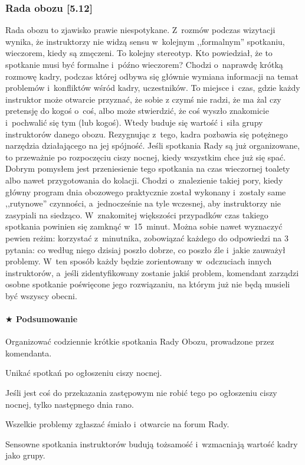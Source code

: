 \documentclass[a5paper,10pt,titlepage,twoside]{article}
\newcommand*{\thecheckbox}{\hss$\Box$} %
\newenvironment*{checklist}
{\list{}{%
\renewcommand*{\makelabel}[1]{\thecheckbox}}}
{\endlist}
\begin{document}
\subsubsection{Rada obozu [5.12]}
Rada obozu to zjawisko prawie niespotykane. Z~rozmów podczas wizytacji wynika, że instruktorzy nie widzą sensu w~kolejnym ,,formalnym'' spotkaniu, wieczorem, kiedy są zmęczeni. To kolejny stereotyp. Kto powiedział, że to spotkanie musi być formalne i~późno wieczorem? Chodzi o~naprawdę krótką rozmowę kadry, podczas której odbywa się głównie wymiana informacji na temat problemów i~konfliktów wśród kadry, uczestników. To miejsce i~czas, gdzie każdy instruktor może otwarcie przyznać, że sobie z czymś nie radzi, że ma żal czy pretensję do kogoś o~coś, albo może stwierdzić, że coś wyszło znakomicie i~pochwalić się tym (lub kogoś). Wtedy buduje się wartość i~siła grupy instruktorów danego obozu. Rezygnując z~tego, kadra pozbawia się potężnego narzędzia działającego na jej spójność. Jeśli spotkania Rady są już organizowane, to przeważnie po rozpoczęciu ciszy nocnej, kiedy wszystkim chce już się spać. Dobrym pomysłem jest przeniesienie tego spotkania na czas wieczornej toalety albo nawet przygotowania do kolacji. Chodzi o~znalezienie takiej pory, kiedy główny program dnia obozowego praktycznie został wykonany i~zostały same ,,rutynowe'' czynności, a~jednocześnie na tyle wczesnej, aby instruktorzy nie zasypiali na siedząco. W~znakomitej większości przypadków czas takiego spotkania powinien się zamknąć w~15~minut. Można sobie nawet wyznaczyć pewien reżim: korzystać z~minutnika, zobowiązać każdego do odpowiedzi na 3 pytania: co według niego dzisiaj poszło dobrze, co poszło źle i~jakie zauważył problemy. W~ten sposób każdy będzie zorientowany w~odczuciach innych instruktorów, a~jeśli zidentyfikowany zostanie jakiś problem, komendant zarządzi osobne spotkanie poświęcone jego rozwiązaniu, na którym już nie będą musieli być wszyscy obecni.
\paragraph{$\bigstar$ Podsumowanie}
\begin{checklist}
\item Organizować codziennie krótkie spotkania Rady Obozu, prowadzone przez komendanta.
\item Unikać spotkań po ogłoszeniu ciszy nocnej.
\item Jeśli jest coś do przekazania zastępowym nie robić tego po ogłoszeniu ciszy nocnej, tylko następnego dnia rano.
\item Wszelkie problemy zgłaszać śmiało i~otwarcie na forum Rady.
\item Sensowne spotkania instruktorów budują tożsamość i~wzmacniają wartość kadry jako grupy.
\end{checklist}
\end{document}
